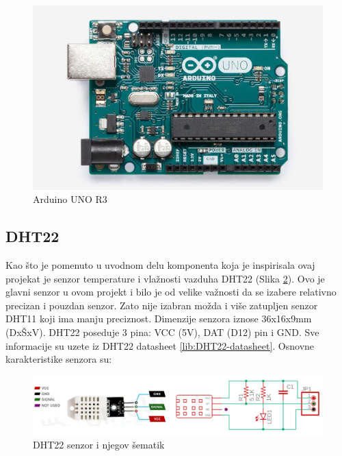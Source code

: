 \documentclass[a4paper, 12pt]{article}
\begin{document}
\begin{figure}[H]
\centering
\includegraphics[scale=0.17]{images/Arduino UNO R3}
\caption{Arduino UNO R3} \label{fig:Arduino}
\end{figure}

\pagebreak


	\subsection{DHT22}

\vspace{10pt}

Kao što je pomenuto u uvodnom delu komponenta koja je inspirisala ovaj projekat je senzor temperature i vlažnosti vazduha DHT22 (Slika \ref{fig:dht22pinssch}). Ovo je glavni senzor u ovom projekt i bilo je od velike važnosti da se izabere relativno precizan i pouzdan senzor. Zato nije izabran možda i više zatupljen senzor DHT11 koji ima manju preciznost. Dimenzije senzora iznose 36x16x9mm (DxŠxV). DHT22 poseduje 3 pina: VCC (5V), DAT (D12) pin i GND. Sve informacije su uzete iz DHT22 datasheet \ref{lib:DHT22-datasheet}. Osnovne karakteristike senzora su:

\begin{figure}[H]
\centering
\includegraphics[scale=0.4]{images/dht22pinssch}
\caption{DHT22 senzor i njegov šematik} \label{fig:dht22pinssch}
\end{figure}
\end{document}
